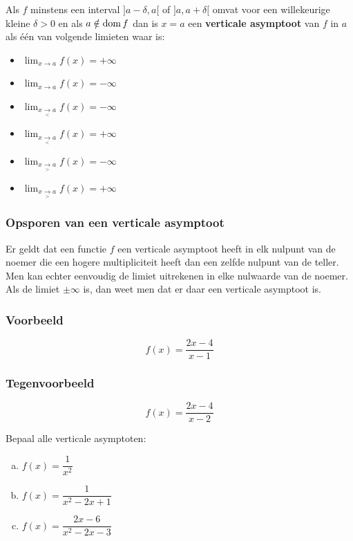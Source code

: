 \documentclass[12pt,twoside,a4paper]{article}
\newenvironment{definitie}
{
  \vspace{0.4cm}
  \begin{mdframed}[nobreak=true,frametitle={Definitie}]
  }{%
  \end{mdframed}
}
\begin{document}
\begin{definitie}
Als $f$ minstens een interval $]a-\delta,a[$ of $]a,a+\delta[$ omvat voor een willekeurige kleine $\delta>0$ en als $a\notin \dom f$ dan is $x=a$ een {\bf verticale asymptoot} van $f$ in $a$ als één van volgende limieten waar is:
\begin{multicols}{3}
  \begin{itemize}
    \item $\lim_{x\to a} f(x)=+\infty$
    \item $\lim_{x\to a} f(x)=-\infty$
    \item $\lim_{x\underset{<}{\to}a} f(x)=-\infty$
    \item $\lim_{x\underset{<}{\to}a} f(x)=+\infty$
    \item $\lim_{x\underset{>}{\to}a} f(x)=-\infty$
    \item $\lim_{x\underset{>}{\to}a} f(x)=+\infty$
  \end{itemize}
\end{multicols}
\end{definitie}

\subsubsection*{Opsporen van een verticale asymptoot}

Er geldt dat een functie $f$ een verticale asymptoot heeft in elk nulpunt van de noemer die een hogere multipliciteit heeft dan een zelfde nulpunt van de teller. Men kan echter eenvoudig de limiet uitrekenen in elke nulwaarde van de noemer. Als de limiet $\pm \infty$ is, dan weet men dat er daar een verticale asymptoot is.

\subsubsection*{Voorbeeld}
$$f(x)=\dfrac{2x-4}{x-1}$$

\subsubsection*{Tegenvoorbeeld}
$$f(x)=\dfrac{2x-4}{x-2}$$

\begin{oefening}
Bepaal alle verticale asymptoten:
\begin{enumerate}[(a)]
  \itemsep.5em
  \item $f(x)=\dfrac{1}{x^2}$
  \item $f(x)=\dfrac{1}{x^2-2x+1}$
  \item $f(x)=\dfrac{2x-6}{x^2-2x-3}$
\end{enumerate}
\end{oefening}
\end{document}
